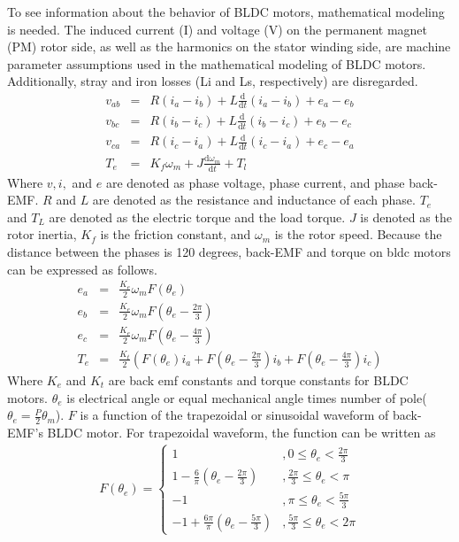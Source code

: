 To see information about the behavior of BLDC motors, mathematical modeling is needed. The induced current (I) and voltage (V) on the permanent magnet (PM) rotor side, as well as the harmonics on the stator winding side, are machine parameter assumptions used in the mathematical modeling of BLDC motors. Additionally, stray and iron losses (Li and Ls, respectively) are disregarded\cite{kumar21}.
\begin{eqnarray}
    v_{ab} &=& R (i_a - i_b) + L \frac{\text{d}}{\text{d}t}(i_a - i_b) + e_a -e_b\\\label{vab}
    v_{bc} &=& R (i_b - i_c) + L \frac{\text{d}}{\text{d}t}(i_b - i_c) + e_b -e_c\\ \label{vbc}
    v_{ca} &=& R (i_c - i_a) + L \frac{\text{d}}{\text{d}t}(i_c - i_a) + e_c -e_a\\\label{vca}
    T_e &=& K_f \omega_m + J \frac{\text{d}\omega_m}{\text{d}t} + T_l
\end{eqnarray}
Where $v,i,$ and $e$ are denoted as phase voltage, phase current, and phase back-EMF. $R$ and $L$ are denoted as the resistance and inductance of each phase. $T_e$ and $T_L$ are denoted as the electric torque and the load torque. $J$ is denoted as the rotor inertia, $K_f$ is the friction constant, and $\omega_m$ is the rotor speed\cite{muniraj20}. Because the distance between the phases is 120 degrees, back-EMF and torque on bldc motors can be expressed as follows.
\begin{eqnarray}
    e_a &=& \frac{K_e}{2} \omega_m F(\theta_e)\\
    e_b &=& \frac{K_e}{2} \omega_m F(\theta_e - \frac{2\pi}{3})\\
    e_c &=& \frac{K_e}{2} \omega_m F(\theta_e - \frac{4\pi}{3})\\
    T_e &=& \frac{K_t}{2}(F(\theta_e)i_a + F(\theta_e - \frac{2\pi}{3})i_b + F(\theta_e - \frac{4\pi}{3})i_c)
\end{eqnarray}
Where $K_e$ and $K_t$ are back emf constants and torque constants for BLDC motors. $\theta_e$ is electrical angle or equal mechanical angle times number of pole($\theta_e = \frac{P}{2}\theta_m$). $F$ is a function of the trapezoidal or sinusoidal waveform of back-EMF's BLDC motor\cite{kelek19}. For trapezoidal waveform, the function can be written as 
\begin{eqnarray}
F(\theta_e) = \left\{
  \begin{array}{lr}
    1 & , 0 \leq \theta_e < \frac{2\pi}{3}\\
    1-\frac{6}{\pi}(\theta_e - \frac{2\pi}{3}) & , \frac{2\pi}{3} \leq \theta_e < \pi\\
    -1 & ,\pi \leq \theta_e < \frac{5\pi}{3}\\
    -1 + \frac{6\pi}{\pi}(\theta_e - \frac{5\pi}{3}) & , \frac{5\pi}{3} \leq \theta_e < 2\pi
  \end{array}
\right.
\end{eqnarray}
